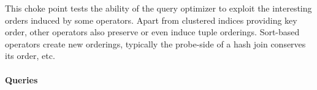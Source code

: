 
This choke point tests the ability of the query optimizer to exploit the
interesting orders induced by some operators. Apart from clustered indices
providing key order, other operators also preserve or even induce tuple
orderings. Sort-based operators create new orderings, typically the probe-side
of a hash join conserves its order, etc.


\paragraph{Queries}
{\raggedright
}